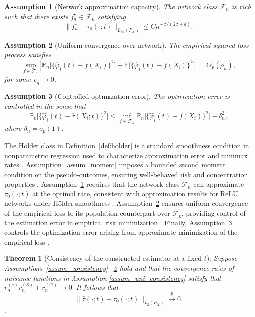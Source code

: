 \documentclass{article}
\newtheorem{theorem}{Theorem}
\newtheorem{assumption}{Assumption}
\begin{document}
\begin{assumption}[Network approximation capacity] \label{assum_capacity}
The network class $\mathcal F_n$ is rich such that there exists $f_n^\star\in\mathcal F_n$ satisfying
    \[
    \|f_n^\star-\tau_0(\cdot;t)\|_{L_\infty(P_X)}
    \le C n^{-\beta/(2\beta+d)}.
    \]
 \end{assumption}

\begin{assumption}[Uniform convergence over network] \label{assum_emp}
 The empirical squared-loss process satisfies
    \[
    \sup_{f\in\mathcal F_n}
    \left|
    \mathbb P_n\big[\{\hat\varphi_i(t)-f(X_i)\}^2\big]
    -
    \mathbb E\big[\{\hat\varphi_i(t)-f(X_i)\}^2\big]
    \right|
    =
    O_p(\rho_n),
    \]
    for some $\rho_n\to 0$.  
\end{assumption}

\begin{assumption}[Controlled optimization error]
\label{assum_opt}  The optimization error is controlled in the sense that
    \[
    \mathbb P_n\big[\{\hat\varphi_i(t)-\hat\tau(X_i;t)\}^2\big]
    \le
    \inf_{f\in\mathcal F_n}
    \mathbb P_n\big[\{\hat\varphi_i(t)-f(X_i)\}^2\big]
    +\delta_n^2,
    \]
    where $\delta_n=o_p(1)$.
\end{assumption}
 

 The H\"older class in Definition~\ref{def:holder} is a standard smoothness condition in nonparametric regression used to characterize approximation error and minimax rates \citep{tsybakov2009introduction,gyorfi2006distribution}. Assumption~\ref{assum_moment} imposes a bounded second moment condition on the pseudo-outcomes, ensuring well-behaved risk and concentration properties \citep{chernozhukov2018double}. Assumption~\ref{assum_capacity} requires that the network class $\mathcal F_n$ can approximate $\tau_0(\cdot;t)$ at the optimal rate, consistent with approximation results for ReLU networks under H\"older smoothness \citep{schmidt2020deep}. Assumption~\ref{assum_emp} ensures uniform convergence of the empirical loss to its population counterpart over $\mathcal F_n$, providing control of the estimation error in empirical risk minimization \citep{van1996weak,bartlett2017spectrally}. Finally, Assumption~\ref{assum_opt} controls the optimization error arising from approximate minimization of the empirical loss \citep{schmidt2020deep}.

\begin{theorem}[Consistency of the constructed estimator at a fixed $t$]\label{thm:consistency_tailored}
    Suppose  Assumptions~\ref{assum_consistency}-- \ref{assum_emp} hold and   that the convergence rates of nuisance functions in Assumption \ref{assum_uni_consistency}  satisfy that 
    \(
    r_n^{(e)}r_n^{(S)}+r_n^{(G)}\to 0.
    \) 
         It follows that
    \[
    \|\hat\tau(\cdot;t)-\tau_0(\cdot;t)\|_{L_2(P_X)}\xrightarrow{p}0.
    \].
\end{theorem}
\end{document}
